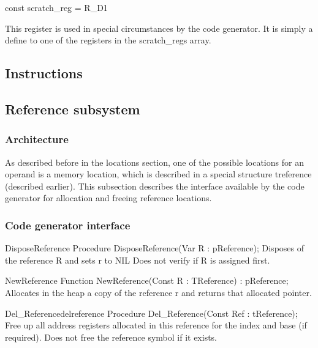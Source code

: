 \documentclass [a4paper,12pt]{article}
\begin{document}
\textsf{const scratch{\_}reg = R{\_}D1}

This register is used in special circumstances by the code generator. It is
simply a define to one of the registers in the \textsf{scratch{\_}regs
}array.

\subsection{Instructions}
\label{subsec:instructionsr}

\subsection{Reference subsystem}
\label{subsec:reference}

\subsubsection{Architecture}
\label{subsubsec:architecturebsysteme}

As described before in the locations section, one of the possible locations
for an operand is a memory location, which is described in a special
structure \textsf{treference} (described earlier). This subsection describes
the interface available by the code generator for allocation and freeing
reference locations.

\subsubsection{Code generator interface}
\label{subsubsec:mylabel28}


\begin{procedure}{DisposeReference}
\Declaration
Procedure DisposeReference(Var R : pReference);
\Description
Disposes of the reference \textsf{R} and sets r to \textsf{NIL}
\Notes
Does not verify if \textsf{R} is assigned first.
\end{procedure}

\begin{function}{NewReference}
\Declaration
Function NewReference(Const R : TReference) : pReference;
\Description
Allocates in the heap a copy of the reference \textsf{r} and returns that
allocated pointer.
\end{function}

\begin{functionl}{Del{\_}Reference}{delreference}
\Declaration
Procedure Del{\_}Reference(Const Ref : tReference);
\Description
Free up all address registers allocated in this reference for the index and
base (if required).
\Notes
Does not free the reference symbol if it exists.
\end{functionl}
\end{document}

